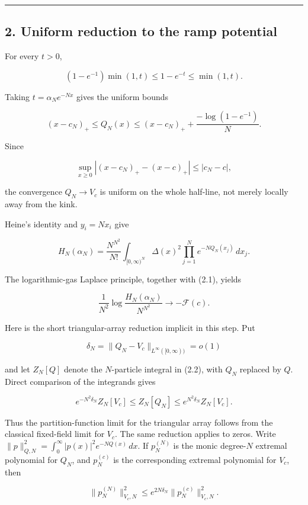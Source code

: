\begin{center}\rule{0.5\linewidth}{0.5pt}\end{center}

\subsection{2. Uniform reduction to the ramp potential}

For every \(t>0\),

\[
(1-e^{-1})\min(1,t)\le1-e^{-t}\le\min(1,t).
\]

Taking \(t=\alpha_Ne^{-Nx}\) gives the uniform bounds

\[
(x-c_N)_+
\le Q_N(x)
\le(x-c_N)_++\frac{-\log(1-e^{-1})}{N}. \tag{DS-2.1}
\]

Since

\[
\sup_{x\ge0}|(x-c_N)_+-(x-c)_+|\le|c_N-c|,
\]

the convergence \(Q_N\to V_c\) is uniform on the whole half-line, not
merely locally away from the kink.

Heine's identity and \(y_i=Nx_i\) give

\[
H_N(\alpha_N)
=\frac{N^{N^2}}{N!}
\int_{[0,\infty)^N}\Delta(x)^2
\prod_{j=1}^N e^{-NQ_N(x_j)}\,dx_j. \tag{DS-2.2}
\]

The logarithmic-gas Laplace principle, together with (2.1), yields

\[
\frac1{N^2}\log\frac{H_N(\alpha_N)}{N^{N^2}}
\longrightarrow-\mathcal F(c). \tag{DS-2.3}
\]

Here is the short triangular-array reduction implicit in this step. Put

\[
\delta_N=\lVert Q_N-V_c\rVert_{L^\infty([0,\infty))}=o(1)
\]

and let \(Z_N[Q]\) denote the \(N\)-particle integral in (2.2), with
\(Q_N\) replaced by \(Q\). Direct comparison of the integrands gives

\[
e^{-N^2\delta_N}Z_N[V_c]
\le Z_N[Q_N]\le
e^{N^2\delta_N}Z_N[V_c]. \tag{DS-2.4}
\]

Thus the partition-function limit for the triangular array follows from
the classical fixed-field limit for \(V_c\). The same reduction applies to
zeros. Write
\(\lVert p\rVert^2_{Q,N}=\int_0^\infty |p(x)|^2e^{-NQ(x)}\,dx\).
If \(p_N^{(N)}\) is the monic degree-\(N\) extremal polynomial for
\(Q_N\), and \(p_N^{(c)}\) is the corresponding extremal polynomial for
\(V_c\), then

\[
\lVert p_N^{(N)}\rVert^2_{V_c,N}
\le e^{2N\delta_N}
\lVert p_N^{(c)}\rVert^2_{V_c,N}. \tag{DS-2.5}
\]

